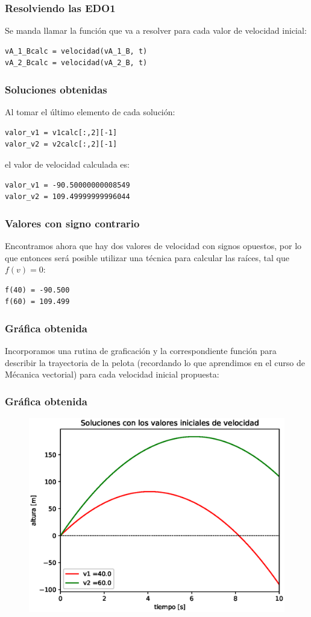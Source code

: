 \begin{frame}[fragile]
\frametitle{Resolviendo las EDO1}
Se manda llamar la función  que va a resolver para cada valor de velocidad inicial:
\begin{lstlisting}[caption=Resolviendo el problema para cada condición inicial, style=codigopython]
vA_1_Bcalc = velocidad(vA_1_B, t)
vA_2_Bcalc = velocidad(vA_2_B, t)
\end{lstlisting}
\end{frame}
\begin{frame}[fragile]
\frametitle{Soluciones obtenidas}
Al tomar el último elemento de cada solución:
\begin{verbatim}
valor_v1 = v1calc[:,2][-1]
valor_v2 = v2calc[:,2][-1]
\end{verbatim}
\pause
el valor de velocidad calculada es:
\begin{verbatim}
valor_v1 = -90.50000000008549
valor_v2 = 109.49999999996044
\end{verbatim}
\end{frame}
\begin{frame}[fragile]
\frametitle{Valores con signo contrario}
Encontramos ahora que hay dos valores de velocidad con signos opuestos, por lo que entonces será posible utilizar una técnica para calcular las raíces, tal que $f(v) = 0$:
\begin{verbatim}
f(40) = -90.500
f(60) = 109.499
\end{verbatim}
\end{frame}
\begin{frame}
\frametitle{Gráfica obtenida}
Incorporamos una rutina de graficación y la correspondiente función para describir la trayectoria de la pelota (recordando lo que aprendimos en el curso de Mécanica vectorial) para cada velocidad inicial propuesta:
\end{frame}
\begin{frame}
\frametitle{Gráfica obtenida}
\begin{figure}[h!]
    \centering
    \includegraphics[scale=0.55]{Imagenes/metodo_disparo_2020_01.eps}
\end{figure}
\end{frame}
